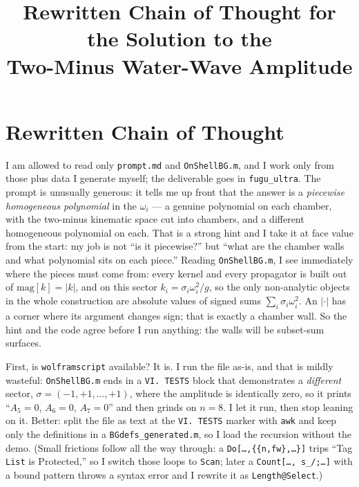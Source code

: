 \documentclass{article}
\title{Rewritten Chain of Thought for the Solution to the\\
Two-Minus Water-Wave Amplitude}
\author{}
\date{}
\begin{document}
\maketitle


\section*{Rewritten Chain of Thought}

I am allowed to read only \texttt{prompt.md} and \texttt{OnShellBG.m}, and I work
only from those plus data I generate myself; the deliverable goes in
\texttt{fugu\_ultra}. The prompt is unusually generous: it tells me up front that
the answer is a \emph{piecewise homogeneous polynomial} in the
$\omega_i$ --- a genuine polynomial on each chamber, with the two-minus kinematic
space cut into chambers, and a different homogeneous polynomial on each. That is
a strong hint and I take it at face value from the start: my job is not ``is it
piecewise?'' but ``what are the chamber walls and what polynomial sits on each
piece.'' Reading \texttt{OnShellBG.m}, I see immediately where the pieces must
come from: every kernel and every propagator is built out of
$\mathrm{mag}[k]=|k|$, and on this sector $k_i=\sigma_i\omega_i^2/g$, so the only
non-analytic objects in the whole construction are absolute values of signed sums
$\sum_i\sigma_i\omega_i^2$. An $|\cdot|$ has a corner where its argument changes
sign; that is exactly a chamber wall. So the hint and the code agree before I run
anything: the walls will be subset-sum surfaces.

First, is \texttt{wolframscript} available? It is. I run the file as-is, and that
is mildly wasteful: \texttt{OnShellBG.m} ends in a \texttt{VI.\ TESTS} block that
demonstrates a \emph{different} sector, $\sigma=(-1,+1,\dots,+1)$, where the
amplitude is identically zero, so it prints ``$A_5=0$, $A_6=0$, $A_7=0$'' and
then grinds on $n=8$. I let it run, then stop leaning on it. Better: split the
file as text at the \texttt{VI.\ TESTS} marker with \texttt{awk} and keep only the
definitions in a \texttt{BGdefs\_generated.m}, so I load the recursion without the
demo. (Small frictions follow all the way through: a
\texttt{Do[\dots,\{\{n,fw\},\dots\}]} trips ``Tag \texttt{List} is Protected,''
so I switch those loops to \texttt{Scan}; later a \texttt{Count[\dots,\,s\_/;\dots]}
with a bound pattern throws a syntax error and I rewrite it as
\texttt{Length@Select}.)
\end{document}
